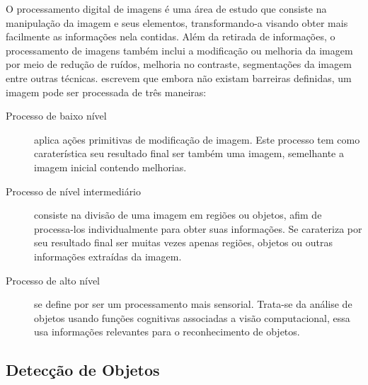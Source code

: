 O processamento digital de imagens é uma área de estudo que consiste na manipulação da imagem e seus elementos, transformando-a visando obter mais facilmente as informações nela contidas\cite{Albuquerque:2001}. Além da retirada de informações, o processamento de imagens também inclui a modificação ou melhoria da imagem por meio de redução de ruídos, melhoria no contraste, segmentações da imagem entre outras técnicas.
 escrevem que embora não existam barreiras definidas, um imagem pode ser processada de três maneiras: 
\begin{description}
	\item[Processo de baixo nível] aplica ações primitivas de modificação de imagem. Este processo tem como caraterística seu resultado final ser também uma imagem, semelhante a imagem inicial contendo melhorias.
	\item[Processo de nível intermediário] consiste na divisão de uma imagem em regiões ou objetos, afim de processa-los individualmente para obter suas informações. Se carateriza por seu resultado final ser muitas vezes apenas regiões, objetos ou outras informações extraídas da imagem.
	\item[Processo de alto nível] se define por ser um processamento mais sensorial. Trata-se da análise de objetos usando funções cognitivas associadas a visão computacional, essa usa informações relevantes para o reconhecimento de objetos.
\end{description}

\subsection{Detecção de Objetos}
\label{Sec:TiposDeDeteccaoDeObjetos}
	
